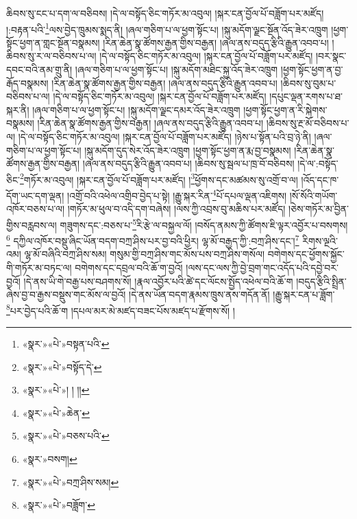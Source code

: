 ཆིབས་སུ་ངང་པ་དག་ལ་བཅིབས། །དེ་ལ་བསྟོད་ཅིང་གཏོར་མ་འབུལ། །སྐར་ངན་བྱོལ་པོ་བཟློག་པར་མཛོད། །:བརྟན་པའི་\footnote{«སྣར་»«པེ་»བསྟན་པའི་}ལས་བྱེད་ཁྲུམས་སྨད་ནི། །ཞལ་གཅིག་པ་ལ་ཕྱག་སྟོང་པ། །སྐུ་མདོག་ལྗང་སྔོན་འོད་ཟེར་འཁྲུག །ཕྱག་སྟོང་ཕྱག་ན་གླང་སྔོན་བསྣམས། །རིན་ཆེན་སྣ་ཚོགས་རྒྱན་གྱིས་བརྒྱན། །ཞལ་ནས་བདུད་རྩིའི་རྒྱུན་འབབ་པ། །ཆིབས་སུ་ར་ལ་བཅིབས་པ་ལ། །དེ་ལ་བསྟོད་ཅིང་གཏོར་མ་འབུལ། །སྐར་ངན་བྱོལ་པོ་བཟློག་པར་མཛོད། །བར་སྣང་དབང་བའི་ནམ་གྲུ་ནི། །ཞལ་གཅིག་པ་ལ་ཕྱག་སྟོང་པ། །སྐུ་མདོག་མཐིང་སྐྱ་འོད་ཟེར་འཁྲུག །ཕྱག་སྟོང་ཕྱག་ན་བྱ་རྒོད་བསྣམས། །རིན་ཆེན་སྣ་ཚོགས་རྒྱན་གྱིས་བརྒྱན། །ཞལ་ནས་བདུད་རྩིའི་རྒྱུན་འབབ་པ། །ཆིབས་སུ་བུམ་པ་བཅིབས་པ་ལ། །དེ་ལ་བསྟོད་ཅིང་གཏོར་མ་འབུལ། །སྐར་ངན་བྱོལ་པོ་བཟློག་པར་མཛོད། །དཔུང་ལྡན་རགས་པ་ཐ་སྐར་ནི། །ཞལ་གཅིག་པ་ལ་ཕྱག་སྟོང་པ། །སྐུ་མདོག་ལྗང་དམར་འོད་ཟེར་འཁྲུག །ཕྱག་སྟོང་ཕྱག་ན་རི་སྐེགས་བསྣམས། །རིན་ཆེན་སྣ་ཚོགས་རྒྱན་གྱིས་བརྒྱན། །ཞལ་ནས་བདུད་རྩིའི་རྒྱུན་འབབ་པ། །ཆིབས་སུ་རྔ་མོ་བཅིབས་པ་ལ། །དེ་ལ་བསྟོད་ཅིང་གཏོར་མ་འབུལ། །སྐར་ངན་བྱོལ་པོ་བཟློག་པར་མཛོད། །ཉེས་པ་སྟོན་པའི་བྲ་ཉེ་ནི། །ཞལ་གཅིག་པ་ལ་ཕྱག་སྟོང་པ། །སྐུ་མདོག་དུད་སེར་འོད་ཟེར་འཁྲུག །ཕྱག་སྟོང་ཕྱག་ན་རྨ་བྱ་བསྣམས། །རིན་ཆེན་སྣ་ཚོགས་རྒྱན་གྱིས་བརྒྱན། །ཞལ་ནས་བདུད་རྩིའི་རྒྱུན་འབབ་པ། །ཆིབས་སུ་སྦལ་པ་ཁྲ་བོ་བཅིབས། །དེ་ལ་:བསྟོད་ཅིང་\footnote{«སྣར་»«པེ་»བསྟོད་དེ་}གཏོར་མ་འབུལ། །སྐར་ངན་བྱོལ་པོ་བཟློག་པར་མཛོད། །\footnote{«སྣར་»«པེ་»། ། །།}ཕྱོགས་དང་མཚམས་སུ་འགྲོ་བ་ལ། །འོད་དང་ཁ་དོག་ཡང་དག་ལྡན། །འགྲོ་བའི་འཕེལ་འགྲིབ་བྱེད་པ་སྟེ། །རྒྱུ་སྐར་རིན་\footnote{«སྣར་»«པེ་»ཆེན་}པོ་དཔལ་ལྡན་འཇིགས། །སོ་སོའི་གཡོག་འཁོར་བཅས་པ་ལ། །གཏོར་མ་ཕུལ་བ་འདི་དག་བཞེས། །ལས་ཀྱི་འབྲས་བུ་མཆིས་པར་མཛོད། །ཅེས་གཏོར་མ་བྱིན་གྱིས་བརླབས་ལ། གཟུགས་དང་:བཅས་པ་\footnote{«སྣར་»«པེ་»བཅས་པའི་}རི་རྩེ་ལ་བསྐྱལ་ལོ། །བསོད་ནམས་ཀྱི་ཚོགས་ཇི་ལྟར་འབྱོར་པ་བསགས།\footnote{«སྣར་»བསག།} དཀྱིལ་འཁོར་བསྡུ་ཞིང་ཡོན་བདག་བཀྲ་ཤིས་པར་བྱ་བའི་ཕྱིར། ལྷ་མོ་བརྒྱད་ཀྱི་:བཀྲ་ཤིས་དང་།\footnote{«སྣར་»«པེ་»བཀྲ་ཤིས་སམ།} རིགས་ལྔའི་འམ། ལྷ་མོ་བཞིའི་བཀྲ་ཤིས་སམ། གསུམ་གྱི་བཀྲ་ཤིས་གང་མོས་པས་བཀྲ་ཤིས་གསོལ། བགེགས་དང་ཕྱོགས་སྐྱོང་གི་གཏོར་མ་བཏང་ལ། བགེགས་དང་དབྲལ་བའི་ཆོ་ག་བྱའོ། །ལས་དང་ལས་ཀྱི་བྱེ་བྲག་གང་འདོད་པའི་དབྱེ་བར་བྱའོ། །དེ་ནས་ཡི་གེ་བརྒྱ་པས་བཤགས་སོ། །རྣལ་འབྱོར་པའི་ཚེ་དང་ལོངས་སྤྱོད་འཕེལ་བའི་ཆོ་ག །བདུད་རྩིའི་སྤྲིན་ཞེས་བྱ་བ་རྒྱས་བསྡུས་གང་མོས་ལ་བྱའོ། །དེ་ནས་ཡོན་བདག་རྣམས་ཁྲུས་ནས་གདོན་ནོ། །རྒྱུ་སྐར་ངན་པ་ཟློག་\footnote{«སྣར་»«པེ་»བཟློག་}པར་བྱེད་པའི་ཆོ་ག །དཔལ་མར་མེ་མཛད་བཟང་པོས་མཛད་པ་རྫོགས་སོ། ། 